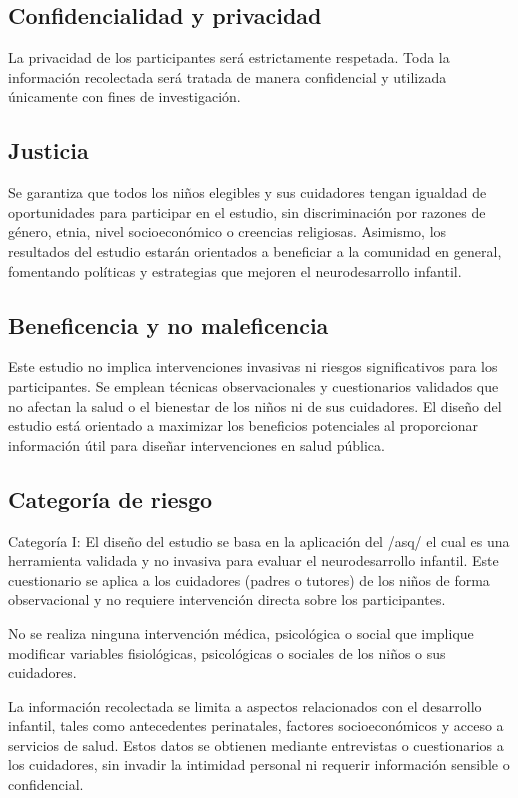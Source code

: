 \documentclass[11pt,letterpaper]{report}
\begin{document}
\subsection{Confidencialidad y privacidad}
La privacidad de los participantes será estrictamente respetada. Toda la
información recolectada será tratada de manera confidencial y utilizada
únicamente con fines de investigación.

\subsection{Justicia}
Se garantiza que todos los niños elegibles y sus cuidadores tengan igualdad de
oportunidades para participar en el estudio, sin discriminación por razones de
género, etnia, nivel socioeconómico o creencias religiosas. Asimismo, los
resultados del estudio estarán orientados a beneficiar a la comunidad en
general, fomentando políticas y estrategias que mejoren el neurodesarrollo
infantil.

\subsection{Beneficencia y no maleficencia}
Este estudio no implica intervenciones invasivas ni riesgos significativos para
los participantes. Se emplean técnicas observacionales y cuestionarios
validados que no afectan la salud o el bienestar de los niños ni de sus
cuidadores. El diseño del estudio está orientado a maximizar los beneficios
potenciales al proporcionar información útil para diseñar intervenciones en
salud pública.

\subsection{Categoría de riesgo}
Categoría I: El diseño del estudio se basa en la aplicación del /asq/ el cual
es una herramienta validada y no invasiva para evaluar el neurodesarrollo
infantil. Este cuestionario se aplica a los cuidadores (padres o tutores) de
los niños de forma observacional y no requiere intervención directa sobre los
participantes.

No se realiza ninguna intervención médica, psicológica o social que implique
modificar variables fisiológicas, psicológicas o sociales de los niños o sus
cuidadores.

La información recolectada se limita a aspectos relacionados con el desarrollo
infantil, tales como antecedentes perinatales, factores socioeconómicos y
acceso a servicios de salud. Estos datos se obtienen mediante entrevistas o
cuestionarios a los cuidadores, sin invadir la intimidad personal ni requerir
información sensible o confidencial.
\end{document}
